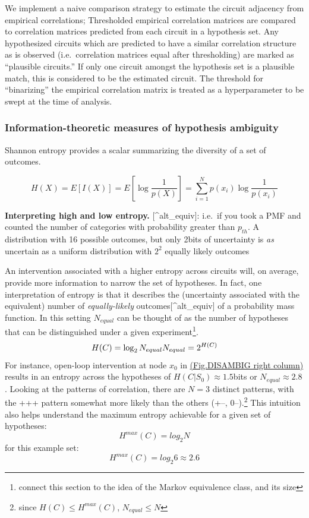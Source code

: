 \documentclass{article}
\begin{document}
We implement a naive comparison strategy to estimate the circuit adjacency from empirical correlations; Thresholded empirical correlation matrices are compared to correlation matrices predicted from each circuit in a hypothesis set. Any hypothesized circuits which are predicted to have a similar correlation structure as is observed
(i.e.~correlation matrices equal after thresholding) are marked as
``plausible circuits.'' If only one circuit amongst the hypothesis set is a plausible match, this is considered to be the estimated circuit. The threshold for ``binarizing'' the empirical correlation matrix is treated as a hyperparameter to be swept at the time of analysis.

\hypertarget{sec:methods-entropy}{%
\subsubsection{Information-theoretic measures of hypothesis ambiguity}\label{sec:methods-entropy}}

Shannon entropy provides a scalar summarizing the diversity of a set of outcomes.

\[H(X) = E[I(X)] = E[\log\frac{1}{p(X)}] = \sum_{i=1}^{N} p(x_i) \log\frac{1}{p(x_i)} \]

\textbf{Interpreting high and low entropy.} {[}\^{}alt\_equiv{]}:
i.e.~if you took a PMF and counted the number of categories with probability greater than \(p_{th}\). A distribution with 16 possible outcomes, but only 2bits of uncertainty is \emph{as} uncertain as a uniform distribution with \(2^2\) equally likely outcomes

An intervention associated with a higher entropy across circuits will, on average, provide more information to narrow the set of hypotheses. In fact, one interpretation of entropy is that it describes the
(uncertainty associated with the equivalent) number of
\emph{equally-likely} outcomes{[}\^{}alt\_equiv{]} of a probability mass function. In this setting \(N_{equal}\) can be thought of as the number of hypotheses that can be distinguished under a given experiment\footnote{connect this section to the idea of the Markov
  equivalence class, and its size}. \[ H(C) = \log_2 N_{equal} \\
N_{equal} = 2^{H(C)}\] For instance, open-loop intervention at node
\(x_0\) in \protect\hyperlink{fig-disambig}{(Fig.DISAMBIG right column)}
results in an entropy across the hypotheses of
\(H(C|S_0) \approx 1.5\)bits or \(N_{equal} \approx 2.8\). Looking at the patterns of correlation, there are \(N=3\) distinct patterns, with the +++ pattern somewhat more likely than the others (+--, 0--).\footnote{since \(H(C)\leq H^{max}(C)\), \(N_{equal} \leq N\)} This intuition also helps understand the maximum entropy achievable for a given set of hypotheses: \[H^{max}(C) = log_2 N\] for this example set:
\[H^{max}(C) = log_2 6 \approx 2.6\]
\end{document}
